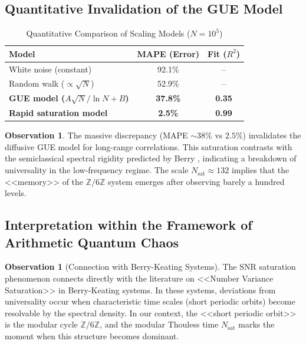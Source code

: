 \documentclass[12pt, a4paper]{article}
\theoremstyle{plain}
\theoremstyle{definition}
\newtheorem{observacion}[teorema]{Observation}
\theoremstyle{remark}
\newcommand{\Z}{\mathbb{Z}}
\begin{document}
\subsection{Quantitative Invalidation of the GUE Model}
\label{subsec:invalidacion_gue}

\begin{table}[H]
\centering
\caption{Quantitative Comparison of Scaling Models ($N=10^5$)}
\label{tab:modelos_snr}
\begin{tabular}{@{}lcc@{}}
\toprule
\textbf{Model} & \textbf{MAPE (Error)} & \textbf{Fit ($R^2$)} \\
\midrule
White noise (constant) & 92.1\% & -- \\
Random walk ($\propto \sqrt{N}$) & 52.9\% & -- \\
\textbf{GUE model ($A\sqrt{N}/\ln N + B$)} & \textbf{37.8\%} & \textbf{0.35} \\
\textbf{Rapid saturation model} & \textbf{2.5\%} & \textbf{0.99} \\
\bottomrule
\end{tabular}
\end{table}

\begin{observacion}
The massive discrepancy (MAPE $\sim 38\%$ vs $2.5\%$) invalidates the diffusive GUE model for long-range correlations. This saturation contrasts with the semiclassical spectral rigidity predicted by Berry \cite{berry1985}, indicating a breakdown of universality in the low-frequency regime. The scale $N_{\text{sat}} \approx 132$ implies that the <<memory>> of the $\Z/6\Z$ system emerges after observing barely a hundred levels.
\end{observacion}


\subsection{Interpretation within the Framework of Arithmetic Quantum Chaos}
\label{subsec:caos_cuantico_interpretacion}

\begin{observacion}[Connection with Berry-Keating Systems]
\label{obs:conexion_berry_keating}
The SNR saturation phenomenon connects directly with the literature on 
<<Number Variance Saturation>> in Berry-Keating systems. In these 
systems, deviations from universality occur when characteristic time 
scales (short periodic orbits) become resolvable by the spectral 
density. In our context, the <<short periodic orbit>> is the 
modular cycle $\mathbb{Z}/6\mathbb{Z}$, and the modular Thouless time 
$N_{\text{sat}}$ marks the moment when this structure becomes dominant.
\end{observacion}
\end{document}
